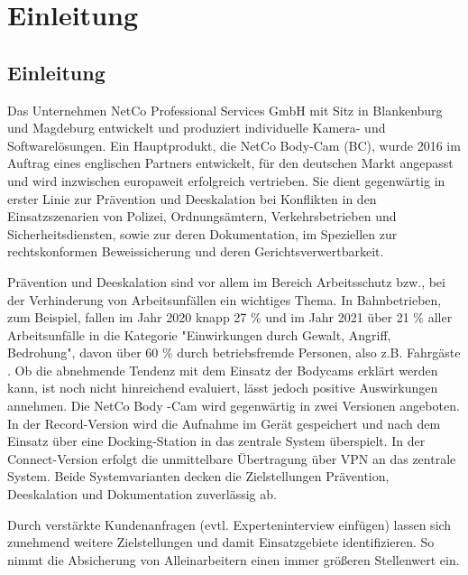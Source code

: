 \documentclass[thesis.tex]{subfiles}
\begin{document}
\chapter{Einleitung}
\label{chap:Einleitung}


\section{Einleitung}
Das Unternehmen NetCo Professional Services GmbH mit Sitz in Blankenburg und Magdeburg entwickelt und produziert individuelle Kamera- und Softwarelösungen.
Ein Hauptprodukt, die NetCo Body-Cam (BC), wurde 2016 im Auftrag eines englischen Partners entwickelt, für den deutschen Markt angepasst und wird inzwischen europaweit erfolgreich vertrieben.
Sie dient gegenwärtig in erster Linie zur Prävention und Deeskalation bei Konflikten in den Einsatzszenarien von Polizei, Ordnungsämtern, Verkehrsbetrieben und Sicherheitsdiensten, sowie zur deren Dokumentation, im Speziellen zur rechtskonformen Beweissicherung und deren Gerichtsverwertbarkeit.

Prävention und Deeskalation sind vor allem im Bereich Arbeitsschutz bzw., bei der Verhinderung von Arbeitsunfällen ein wichtiges Thema.
In Bahnbetrieben, zum Beispiel, fallen im Jahr 2020 knapp 27 \% und im Jahr 2021 über 21 \% aller Arbeitsunfälle in die Kategorie "Einwirkungen durch Gewalt, Angriff, Bedrohung", davon über 60 \% durch betriebsfremde Personen, also z.B. Fahrgäste \cite[jeweils S.87 ff.]{Unfallgeschehen2020,Unfallgeschehen2021}.
Ob die abnehmende Tendenz mit dem Einsatz der Bodycams erklärt werden kann, ist noch nicht hinreichend evaluiert, lässt jedoch positive Auswirkungen annehmen.
Die NetCo Body -Cam wird gegenwärtig in zwei Versionen angeboten.
In der Record-Version wird die Aufnahme im Gerät gespeichert und nach dem Einsatz über eine Docking-Station in das zentrale System überspielt.
In der Connect-Version erfolgt die unmittelbare Übertragung über VPN an das zentrale System.
Beide Systemvarianten decken die Zielstellungen Prävention, Deeskalation und Dokumentation zuverlässig ab.

Durch verstärkte Kundenanfragen (evtl. Experteninterview einfügen) lassen sich zunehmend weitere Zielstellungen und damit Einsatzgebiete identifizieren.
So nimmt die Absicherung von Alleinarbeitern einen immer größeren Stellenwert ein.
\end{document}
